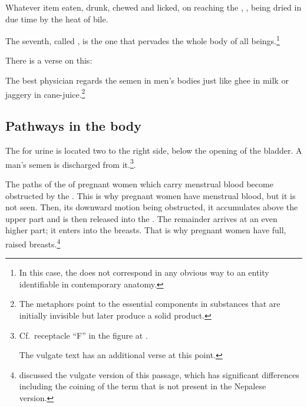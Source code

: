 \begin{translation}
 \item[19]
 
 \begin{sloka}
   Whatever item eaten, drunk, chewed and licked, on reaching the
, , being dried in due
time by the heat of bile.
 \end{sloka}
 
\item[20]

The seventh, called , is the one that
pervades the whole body of all beings.\footnote{In this case, the
     does not correspond in any obvious way to an entity
    identifiable in contemporary anatomy.}

\item[21]

There is a verse on this:
\begin{sloka}   
    The best physician regards the semen in men's bodies just like
ghee in milk or jaggery in cane-juice.\footnote{The metaphors
    point to the essential components in substances that are initially
    invisible but later produce a solid product.}
\end{sloka}

\subsection{Pathways in the body}

\item[22]

The  for urine is located two  to the right side, below the opening of the bladder. A man's
semen is discharged from it.\footnote{Cf.\ receptacle “F” in the
    figure at \cite[236]{wuja-2008a}.
    
    The vulgate text has an additional
    verse at this point.}.

\item[24]

The paths of the  of pregnant women which carry
menstrual blood become obstructed by the . This is
why pregnant women have menstrual blood, but it is not seen. Then, its
downward motion being obstructed, it accumulates above the upper part
and is then released into the . %
The remainder arrives at an even higher part; it enters into the
breasts. %
That is why pregnant women have full, raised
breasts.\footnote{\citet[81--82]{das-2003} discussed the vulgate
    version of this passage, which has significant differences
    including the coining of the term  that is not present
    in the Nepalese version.}



\end{translation}

